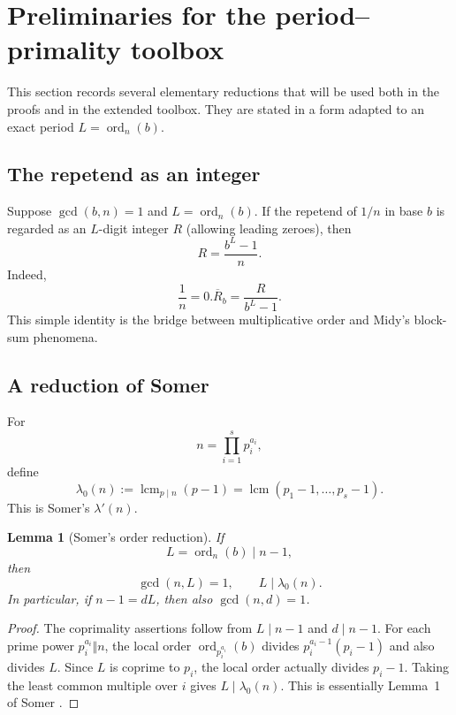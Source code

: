 \documentclass[11pt]{article}
\newtheorem{lemma}[theorem]{Lemma}
\newcommand{\ord}{\operatorname{ord}}
\begin{document}
\section{Preliminaries for the period--primality toolbox}
\label{sec:toolbox-prelim}

This section records several elementary reductions that will be used both in
the proofs and in the extended toolbox.  They are stated in a form adapted to an
exact period $L=\ord_n(b)$.

\subsection{The repetend as an integer}

Suppose $\gcd(b,n)=1$ and $L=\ord_n(b)$.  If the repetend of $1/n$ in
base $b$ is regarded as an $L$-digit integer $R$ (allowing leading zeroes),
then
\begin{equation}
R=\frac{b^L-1}{n}.
\label{eq:repetend-integer}
\end{equation}
Indeed,
\[
\frac1n=0.\overline{R}_b=\frac{R}{b^L-1}.
\]
This simple identity is the bridge between multiplicative order and Midy's
block-sum phenomena.

\subsection{A reduction of Somer}

For
\[
n=\prod_{i=1}^s p_i^{a_i},
\]
define
\begin{equation}
\lambda_0(n):=\operatorname{lcm}_{p\mid n}(p-1)
 =\operatorname{lcm}(p_1-1,\ldots,p_s-1).
\label{eq:lambda0}
\end{equation}
This is Somer's $\lambda'(n)$.

\begin{lemma}[Somer's order reduction]
\label{lem:somer-lambda0}
If
\[
L=\ord_n(b)\mid n-1,
\]
then
\[
\gcd(n,L)=1,
\qquad
L\mid\lambda_0(n).
\]
In particular, if $n-1=dL$, then also $\gcd(n,d)=1$.
\end{lemma}

\begin{proof}
The coprimality assertions follow from $L\mid n-1$ and $d\mid n-1$.
For each prime power $p_i^{a_i}\Vert n$, the local order
$\ord_{p_i^{a_i}}(b)$ divides $p_i^{a_i-1}(p_i-1)$ and also divides $L$.
Since $L$ is coprime to $p_i$, the local order actually divides $p_i-1$.
Taking the least common multiple over $i$ gives
$L\mid\lambda_0(n)$.  This is essentially Lemma~1 of Somer
\cite{Somer1989}.
\end{proof}
\end{document}
